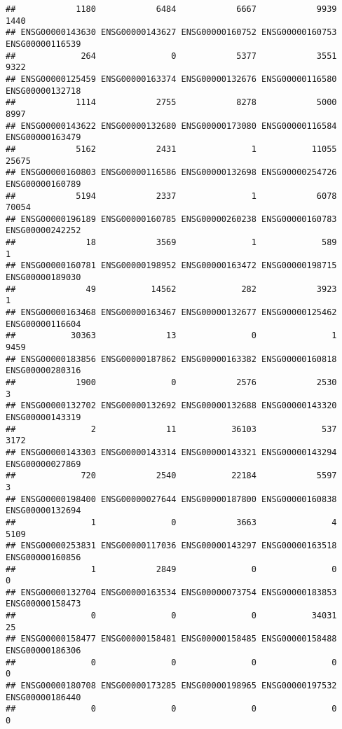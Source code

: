 \documentclass[
]{article}
\begin{document}
\begin{verbatim}
##            1180            6484            6667            9939            1440 
## ENSG00000143630 ENSG00000143627 ENSG00000160752 ENSG00000160753 ENSG00000116539 
##             264               0            5377            3551            9322 
## ENSG00000125459 ENSG00000163374 ENSG00000132676 ENSG00000116580 ENSG00000132718 
##            1114            2755            8278            5000            8997 
## ENSG00000143622 ENSG00000132680 ENSG00000173080 ENSG00000116584 ENSG00000163479 
##            5162            2431               1           11055           25675 
## ENSG00000160803 ENSG00000116586 ENSG00000132698 ENSG00000254726 ENSG00000160789 
##            5194            2337               1            6078           70054 
## ENSG00000196189 ENSG00000160785 ENSG00000260238 ENSG00000160783 ENSG00000242252 
##              18            3569               1             589               1 
## ENSG00000160781 ENSG00000198952 ENSG00000163472 ENSG00000198715 ENSG00000189030 
##              49           14562             282            3923               1 
## ENSG00000163468 ENSG00000163467 ENSG00000132677 ENSG00000125462 ENSG00000116604 
##           30363              13               0               1            9459 
## ENSG00000183856 ENSG00000187862 ENSG00000163382 ENSG00000160818 ENSG00000280316 
##            1900               0            2576            2530               3 
## ENSG00000132702 ENSG00000132692 ENSG00000132688 ENSG00000143320 ENSG00000143319 
##               2              11           36103             537            3172 
## ENSG00000143303 ENSG00000143314 ENSG00000143321 ENSG00000143294 ENSG00000027869 
##             720            2540           22184            5597               3 
## ENSG00000198400 ENSG00000027644 ENSG00000187800 ENSG00000160838 ENSG00000132694 
##               1               0            3663               4            5109 
## ENSG00000253831 ENSG00000117036 ENSG00000143297 ENSG00000163518 ENSG00000160856 
##               1            2849               0               0               0 
## ENSG00000132704 ENSG00000163534 ENSG00000073754 ENSG00000183853 ENSG00000158473 
##               0               0               0           34031              25 
## ENSG00000158477 ENSG00000158481 ENSG00000158485 ENSG00000158488 ENSG00000186306 
##               0               0               0               0               0 
## ENSG00000180708 ENSG00000173285 ENSG00000198965 ENSG00000197532 ENSG00000186440 
##               0               0               0               0               0 

\end{verbatim}
\end{document}
